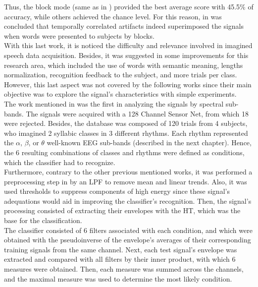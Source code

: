 Thus,  the block mode (same as in \cite{marek}) provided the best average score with 45.5\% of accuracy, while others achieved the chance level. For this reason, in \cite{porbadnigk2009eeg} was concluded that temporally correlated artifacts indeed superimposed the signals when words were presented to subjects by blocks.\\

With this last work, it is noticed the difficulty and relevance involved in imagined speech data acquisition. Besides, it was suggested in \cite{porbadnigk2009eeg} some improvements for this research area, which included the use of words with semantic meaning, lengths normalization, recognition feedback to the subject, and more trials per class. However, this last aspect was not covered by the following works since their main objective was to explore the signal's characteristics with simple experiments.\\

The work mentioned in \cite{d2009toward} was the first in analyzing the signals by spectral sub-bands. The signals were acquired with a 128 Channel Sensor Net, from which 18 were rejected. Besides, the database was composed of 120 trials from 4 subjects, who imagined 2 syllabic classes in 3 different rhythms. Each rhythm represented the $\alpha$, $\beta$, or $\theta$ well-known EEG sub-bands (described in the next chapter). Hence, the 6 resulting combinations of classes and rhythms were defined as conditions, which the classifier had to recognize.\\

Furthermore, contrary to the other previous mentioned works, it was performed a preprocessing step in \cite{d2009toward} by an LPF to remove mean and linear trends. Also, it was used thresholds to suppress components of high energy since these signal's adequations would aid in improving the classifier's recognition. Then, the signal's processing consisted of extracting their envelopes with the HT, which was the base for the classification.\\

The classifier consisted of 6 filters associated with each condition, and which were obtained with the pseudoinverse of the envelope's averages of their corresponding training signals from the same channel. Next, each test signal's envelope was extracted and compared with all filters by their inner product, with which 6 measures were obtained. Then, each measure was summed across the channels, and the maximal measure was used to determine the most likely condition.\\

